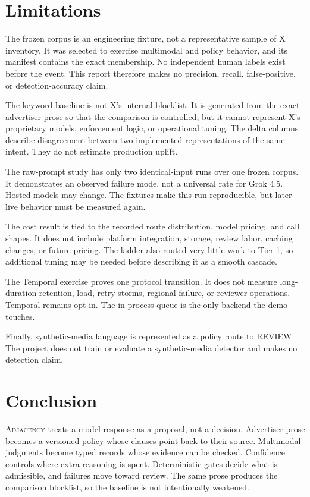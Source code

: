 \documentclass{article}
\newcommand{\Adj}{\textsc{Adjacency}\xspace}
\begin{document}
\section{Limitations}
\label{sec:limitations}

The frozen corpus is an engineering fixture, not a representative sample of X inventory. It was
selected to exercise multimodal and policy behavior, and its manifest contains the exact membership.
No independent human labels exist before the event. This report therefore makes no precision,
recall, false-positive, or detection-accuracy claim.

The keyword baseline is not X's internal blocklist. It is generated from the exact advertiser prose
so that the comparison is controlled, but it cannot represent X's proprietary models, enforcement
logic, or operational tuning. The delta columns describe disagreement between two implemented
representations of the same intent. They do not estimate production uplift.

The raw-prompt study has only two identical-input runs over one frozen corpus. It demonstrates an
observed failure mode, not a universal rate for Grok 4.5. Hosted models may change. The fixtures make
this run reproducible, but later live behavior must be measured again.

The cost result is tied to the recorded route distribution, model pricing, and call shapes. It does
not include platform integration, storage, review labor, caching changes, or future pricing. The
ladder also routed very little work to Tier 1, so additional tuning may be needed before describing it
as a smooth cascade.

The Temporal exercise proves one protocol transition. It does not measure long-duration retention,
load, retry storms, regional failure, or reviewer operations. Temporal remains opt-in. The in-process
queue is the only backend the demo touches.

Finally, synthetic-media language is represented as a policy route to REVIEW. The project does not
train or evaluate a synthetic-media detector and makes no detection claim.

\section{Conclusion}
\label{sec:conclusion}

\Adj treats a model response as a proposal, not a decision. Advertiser prose becomes a versioned
policy whose clauses point back to their source. Multimodal judgments become typed records whose
evidence can be checked. Confidence controls where extra reasoning is spent. Deterministic gates
decide what is admissible, and failures move toward review. The same prose produces the comparison
blocklist, so the baseline is not intentionally weakened.
\end{document}
